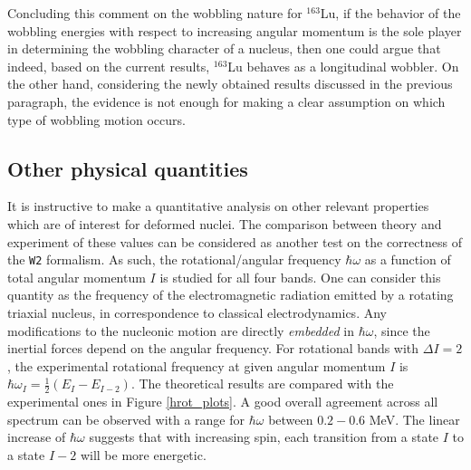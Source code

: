 \documentclass[myclassdoc,debug]{rjparticle}
\begin{document}
Concluding this comment on the wobbling nature for $^{163}$Lu, if the behavior of the wobbling energies with respect to increasing angular momentum is the sole player in determining the wobbling character of a nucleus, then one could argue that indeed, based on the current results, $^{163}$Lu behaves as a longitudinal wobbler. On the other hand, considering the newly obtained results discussed in the previous paragraph, the evidence is not enough for making a clear assumption on which type of wobbling motion occurs.

\subsection{Other physical quantities}\label{subsection:routhians}

It is instructive to make a quantitative analysis on other relevant properties which are of interest for deformed nuclei. The comparison between theory and experiment of these values can be considered as another test on the correctness of the \texttt{W2} formalism. As such, the rotational/angular frequency $\hbar\omega$ as a function of total angular momentum $I$ is studied for all four bands. One can consider this quantity as the frequency of the electromagnetic radiation emitted by a rotating triaxial nucleus, in correspondence to classical electrodynamics. Any modifications to the nucleonic motion are directly \emph{embedded} in $\hbar\omega$, since the inertial forces depend on the angular frequency. For rotational bands with $\Delta I=2$, the experimental rotational frequency at given angular momentum $I$ is $\hbar\omega_I=\frac{1}{2}\left(E_I-E_{I-2}\right)$. The theoretical results are compared with the experimental ones in Figure \ref{hrot_plots}. A good overall agreement across all spectrum can be observed with a range for $\hbar\omega$ between $0.2-0.6$ MeV. The linear increase of $\hbar\omega$ suggests that with increasing spin, each transition from a state $I$ to a state $I-2$ will be more energetic.
\end{document}
